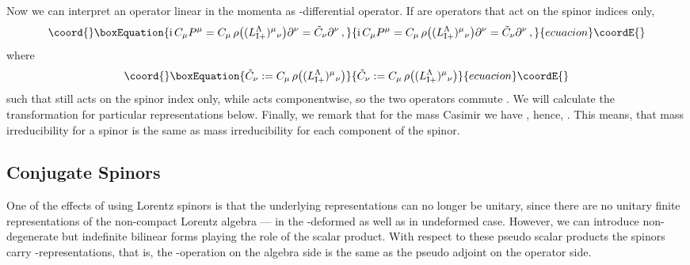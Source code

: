 \documentclass[12pt,a4paper]{article}
\providecommand{\I}{\mathrm{i}}
\providecommand{\R}{\mathcal{R}}
\begin{document}
Now we can interpret an operator linear in the momenta as
\coordHE{}-differential operator. If \coordHE{} are operators
that act on the spinor indices only,
\begin{equation}\coord{}\boxEquation{
  \I\,C_\mu  P^\mu
  = C_\mu\,\rho\bigl( (L^\Lambda_{\mathrm{I}+})^{\mu}{}_{\nu}\bigr)
  \partial^{\nu} = \tilde{C}_{\nu} \partial^{\nu} \,,
}{
  \I\,C_\mu  P^\mu
  = C_\mu\,\rho\bigl( (L^\Lambda_{\mathrm{I}+})^{\mu}{}_{\nu}\bigr)
  \partial^{\nu} = \tilde{C}_{\nu} \partial^{\nu} \,,
}{ecuacion}\coordE{}\end{equation} 
where
\begin{equation}\coord{}\boxEquation{
\label{eq:Optilde}
  \tilde{C}_{\nu} :=
  C_\mu\,\rho\bigl( (L^\Lambda_{\mathrm{I}+})^{\mu}{}_{\nu}\bigr)
}{
\tilde{C}_{\nu} :=
  C_\mu\,\rho\bigl( (L^\Lambda_{\mathrm{I}+})^{\mu}{}_{\nu}\bigr)
}{ecuacion}\coordE{}\end{equation}
such that \coordHE{} still acts on the spinor index only, while
\myHighlight{$\partial^{\nu}$}\coordHE{} acts componentwise, so the two operators commute
\coordHE{}. We will calculate the
transformation \coordHE{} for particular
representations below. Finally, we remark that for the mass Casimir we
have \myHighlight{$P_\mu P^\mu = \R^{-1}(1\otimes P_\mu P^\mu)\R = 1\otimes P_\mu
P^\mu$}\coordHE{}, hence, \coordHE{}. This
means, that mass irreducibility for a spinor is the same as mass
irreducibility for each component of the spinor.


\subsection{Conjugate Spinors}

One of the effects of using Lorentz spinors is that the underlying
representations can no longer be unitary, since there are no unitary
finite representations of the non-compact Lorentz algebra --- in the
\coordHE{}-deformed as well as in undeformed case. However, we can introduce
non-degenerate but indefinite bilinear forms playing the role of the
scalar product. With respect to these pseudo scalar products the
spinors carry \myHighlight{$*$}\coordHE{}-representations, that is, the \myHighlight{$*$}\coordHE{}-operation on the
algebra side is the same as the pseudo adjoint on the operator side.
\end{document}
